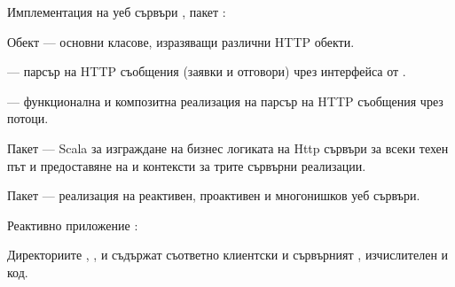 \begin{attachment}{Имплементация на уеб сървъри}
  \label{att:web-server}
  , пакет :
  
  \begin{itemize*}
    \item Обект  — основни класове, изразяващи различни HTTP обекти.
    
    \item {} — парсър на HTTP съобщения (заявки и отговори) чрез интерфейса от .
    
    \item {} — функционална и композитна реализация на парсър на HTTP съобщения чрез  потоци.
    
    \item Пакет  — Scala  за изграждане на бизнес логиката на Http сървъри за всеки техен път и предоставяне на  и  контексти за трите сървърни реализации.
    
    \item Пакет  — реализация на реактивен, проактивен и многонишков уеб сървъри.
  \end{itemize*}
\end{attachment}

\begin{attachment}{Реактивно приложение}
  \label{att:reactive-application}
  :
  
  Директориите , ,  и  съдържат съответно клиентски и сървърният , изчислителен и  код.
\end{attachment}
